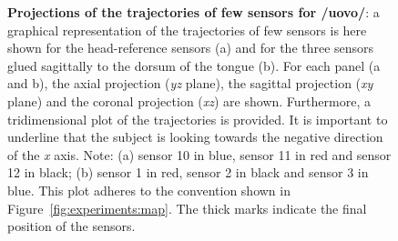 \begin{figure}
  \centering
	\hspace{0.05\textwidth}

	\caption[Projections of the trajectories of few sensors for 
	/uovo/]{\textbf{Projections of the trajectories of few sensors for /uovo/}: 
	a graphical representation of the trajectories of few sensors is here
	shown for the head-reference sensors (a) and for the three sensors glued 
	sagittally to the dorsum of the tongue (b).
	For each panel (a and b), the axial projection (\emph{yz} plane), 
	the sagittal
	projection (\emph{xy} plane) and the coronal projection (\emph{xz}) are
	shown.
	Furthermore, a tridimensional plot of the trajectories is provided.
	It is important to underline that the subject is looking towards the
	negative direction of the \emph{x} axis.
	Note: (a) sensor 10 in blue, sensor 11 in red and sensor 12 in black; 
	(b) sensor 1 in red, sensor 2 in black and sensor 3 in blue.
	This plot adheres to the convention shown in 
	Figure~\ref{fig:experiments:map}.
	The thick marks indicate the final position of the sensors.
	}
	\label{fig:results:uovo:complex}
\end{figure}
